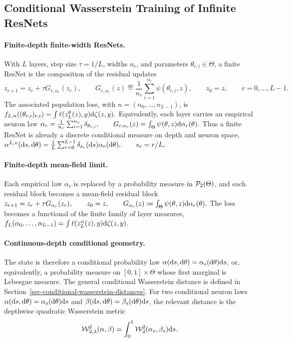 \subsection{Conditional Wasserstein Training of Infinite ResNets}
\label{sec-conditional-wasserstein-resnets}
\paragraph{Finite-depth finite-width ResNets.}
With $L$ layers, step size $\tau=1/L$, widths $n_r$, and parameters $\theta_{r,i}\in\Theta$, a finite ResNet is the composition of the residual updates
\begin{equation}\label{eq-finite-resnet}
z_{r+1}
=
z_r+\tau G_{r,n_r}(z_r),
\qquad
G_{r,n_r}(z)
\eqdef
\frac1{n_r}\sum_{i=1}^{n_r}\psi(\theta_{r,i},z),
\qquad
z_0=z,\qquad r=0,\ldots,L-1.
\end{equation}
The associated population loss, with $n=(n_0,\ldots,n_{L-1})$, is \(f_{L,n}((\theta_{r,i})_{r,i}) = \int \ell(z_L^{\theta}(z),y)\mathrm{d}\zeta(z,y).\)
Equivalently, each layer carries an empirical neuron law
\(\alpha_r = \frac1{n_r}\sum_{i=1}^{n_r}\delta_{\theta_{r,i}}, \qquad G_{r,n_r}(z) = \int_\Theta\psi(\theta,z)\mathrm{d}\alpha_r(\theta).\)
Thus a finite ResNet is already a discrete conditional measure on depth and neuron space, \(\alpha^{L,n}(\mathrm{d} s,\mathrm{d}\theta) = \frac1L\sum_{r=0}^{L-1}\delta_{s_r}(\mathrm{d} s)\alpha_r(\mathrm{d}\theta), \qquad s_r=r/L,\)
\paragraph{Finite-depth mean-field limit.}
Each empirical law $\alpha_r$ is replaced by a probability measure in $\mathcal{P}_2(\Theta)$, and each residual block becomes a mean-field residual block
\(z_{r+1} = z_r+\tau G_{\alpha_r}(z_r), \qquad z_0=z, \qquad G_{\alpha_r}(z) \coloneqq \int_\Theta\psi(\theta,z)\mathrm{d}\alpha_r(\theta).\)
The loss becomes a functional of the finite family of layer measures, \(f_L(\alpha_0,\ldots,\alpha_{L-1}) = \int \ell(z_L^\alpha(z),y)\mathrm{d}\zeta(z,y).\)
\paragraph{Continuous-depth conditional geometry.}
The state is therefore a conditional probability law
\(\alpha(\mathrm{d} s,\mathrm{d}\theta)=\alpha_s(\mathrm{d}\theta)\mathrm{d} s,\)
or, equivalently, a probability measure on $[0,1]\times\Theta$ whose first marginal is Lebesgue measure. The general conditional Wasserstein distance is defined in Section~\ref{sec-conditional-wasserstein-distances}. For two conditional neuron laws $\alpha(\mathrm{d} s,\mathrm{d}\theta)=\alpha_s(\mathrm{d}\theta)\mathrm{d} s$ and $\beta(\mathrm{d} s,\mathrm{d}\theta)=\beta_s(\mathrm{d}\theta)\mathrm{d} s$, the relevant distance is the depthwise quadratic Wasserstein metric
\begin{equation}\label{eq-resnet-depth-wasserstein}
\operatorname{\mathcal{W}}_{2,\lambda}^2(\alpha,\beta)
=
\int_0^1\operatorname{\mathcal{W}}_2^2(\alpha_s,\beta_s)\mathrm{d} s.
\end{equation}
